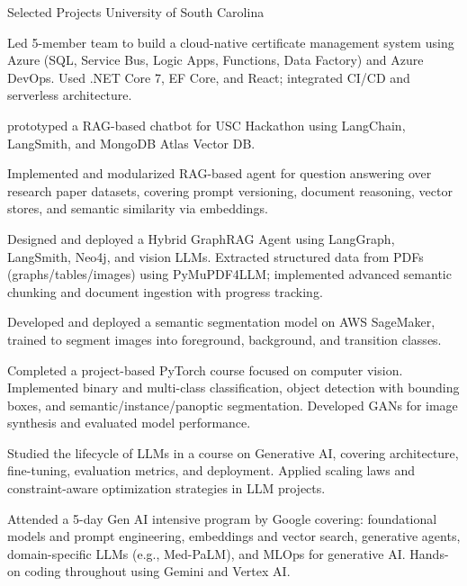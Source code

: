 \begin{cventries}

    \cventry
        {Selected Projects} 
        {University of South Carolina} 
        {} 
        {} 
        {
            \begin{cvitemsfree}
                \item{Led 5-member team to build a cloud-native certificate management system using Azure (SQL, Service Bus, Logic Apps, Functions, Data Factory) and Azure DevOps. Used .NET Core 7, EF Core, and React; integrated CI/CD and serverless architecture.}
                \item{prototyped a RAG-based chatbot for USC Hackathon using LangChain, LangSmith, and MongoDB Atlas Vector DB.}
                \item{Implemented and modularized RAG-based agent for question answering over research paper datasets, covering prompt versioning, document reasoning, vector stores, and semantic similarity via embeddings.}
                \item{Designed and deployed a Hybrid GraphRAG Agent using LangGraph, LangSmith, Neo4j, and vision LLMs. Extracted structured data from PDFs (graphs/tables/images) using PyMuPDF4LLM; implemented advanced semantic chunking and document ingestion with progress tracking.}
                \item{Developed and deployed a semantic segmentation model on AWS SageMaker, trained to segment images into foreground, background, and transition classes.}
                \item{Completed a project-based PyTorch course focused on computer vision. Implemented binary and multi-class classification, object detection with bounding boxes, and semantic/instance/panoptic segmentation. Developed GANs for image synthesis and evaluated model performance.}
                \item{Studied the lifecycle of LLMs in a course on Generative AI, covering architecture, fine-tuning, evaluation metrics, and deployment. Applied scaling laws and constraint-aware optimization strategies in LLM projects.}
                \item{Attended a 5-day Gen AI intensive program by Google covering: foundational models and prompt engineering, embeddings and vector search, generative agents, domain-specific LLMs (e.g., Med-PaLM), and MLOps for generative AI. Hands-on coding throughout using Gemini and Vertex AI.}

\end{cvitemsfree}}
\end{cventries}
